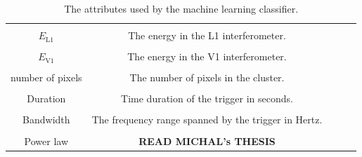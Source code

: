 \documentclass[11pt]{cuthesis}
\begin{document}
\begin{table}
\begin{tabular}{| c | c | c | c | c |}
\hline
& \\
$E_\text{L1}$& The energy in the L1 interferometer. \\

\hline
& \\
$E_\text{V1}$& The energy in the V1 interferometer. \\

\hline
& \\
number of pixels & The number of pixels in the cluster. \\

\hline
& \\
Duration & Time duration of the trigger in seconds. \\

\hline
& \\
Bandwidth & The frequency range spanned by the trigger in Hertz. \\

\hline
& \\ 
Power law & \textbf{READ MICHAL's THESIS} \\

\hline
\hline
\end{tabular}
\caption{The attributes used by the machine learning classifier.}
\label{coherent energy table}
\end{table}

\FloatBarrier
\end{document}
